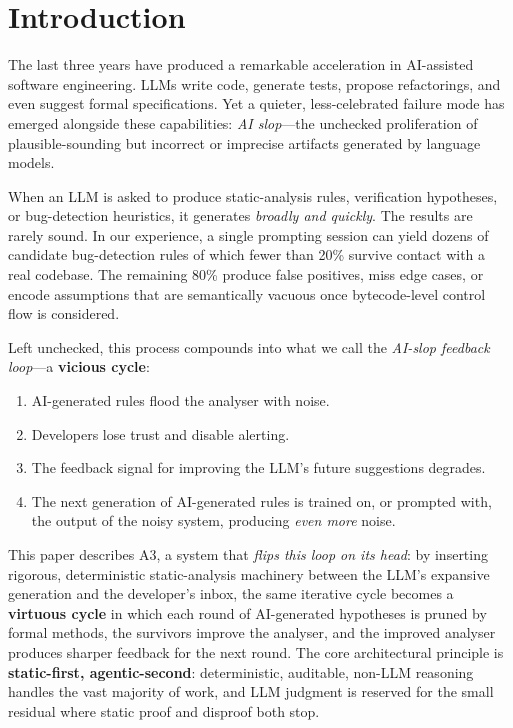 \documentclass[sigconf,review,anonymous]{acmart}
\begin{document}
\maketitle

\section{Introduction}\label{sec:intro}

The last three years have produced a remarkable acceleration in AI-assisted software engineering.
LLMs write code, generate tests, propose refactorings, and even suggest formal specifications.
Yet a quieter, less-celebrated failure mode has emerged alongside these capabilities: \emph{AI slop}---the unchecked proliferation of plausible-sounding but incorrect or imprecise artifacts generated by language models.

When an LLM is asked to produce static-analysis rules, verification hypotheses, or bug-detection heuristics, it generates \emph{broadly and quickly}.
The results are rarely sound.
In our experience, a single prompting session can yield dozens of candidate bug-detection rules of which fewer than 20\% survive contact with a real codebase.
The remaining 80\% produce false positives, miss edge cases, or encode assumptions that are semantically vacuous once bytecode-level control flow is considered.

Left unchecked, this process compounds into what we call the \emph{AI-slop feedback loop}---a \textbf{vicious cycle}:
\begin{enumerate}
  \item AI-generated rules flood the analyser with noise.
  \item Developers lose trust and disable alerting.
  \item The feedback signal for improving the LLM's future suggestions degrades.
  \item The next generation of AI-generated rules is trained on, or prompted with, the output of the noisy system, producing \emph{even more} noise.
\end{enumerate}

This paper describes \textsc{A3}, a system that \emph{flips this loop on its head}: by inserting rigorous, deterministic static-analysis machinery between the LLM's expansive generation and the developer's inbox, the same iterative cycle becomes a \textbf{virtuous cycle} in which each round of AI-generated hypotheses is pruned by formal methods, the survivors improve the analyser, and the improved analyser produces sharper feedback for the next round.
The core architectural principle is \textbf{static-first, agentic-second}: deterministic, auditable, non-LLM reasoning handles the vast majority of work, and LLM judgment is reserved for the small residual where static proof and disproof both stop.
\end{document}
